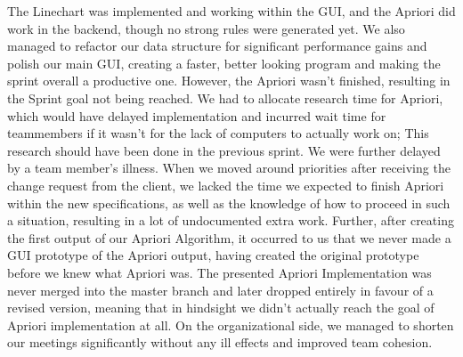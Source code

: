 The Linechart was implemented and working within the GUI, and the Apriori did work in the backend, though no strong rules were generated yet. We also managed to refactor our data structure for significant performance gains and polish our main GUI, creating a faster, better looking program and making the sprint overall a productive one. 
However, the Apriori wasn't finished, resulting in the Sprint goal not being reached. 
We had to allocate research time for Apriori, which would have delayed implementation and incurred wait time for teammembers if it wasn't for the lack of computers to actually work on; This research should have been done in the previous sprint. We were further delayed by a team member's illness.
When we moved around priorities after receiving the change request from the client, we lacked the time we expected to finish Apriori within the new specifications, as well as the knowledge of how to proceed in such a situation, resulting in a lot of undocumented extra work. 
Further, after creating the first output of our Apriori Algorithm, it occurred to us that we never made a GUI prototype of the Apriori output, having created the original prototype before we knew what Apriori was.
The presented Apriori Implementation was never merged into the master branch and later dropped entirely in favour of a revised version, meaning that in hindsight we didn't actually reach the goal of Apriori implementation at all.
On the organizational side, we managed to shorten our meetings significantly without any ill effects and improved team cohesion.